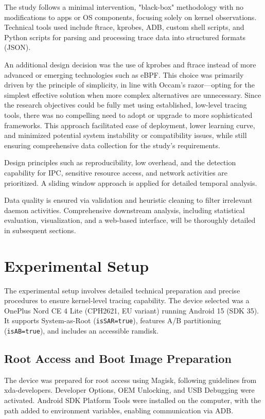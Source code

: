 \documentclass[a4paper,12pt]{report}
\begin{document}
The study follows a minimal intervention, "black-box" methodology with no modifications to apps or OS components, focusing solely on kernel observations. Technical tools used include ftrace, kprobes, ADB, custom shell scripts, and Python scripts for parsing and processing trace data into structured formats (JSON).

An additional design decision was the use of kprobes and ftrace instead of more advanced or emerging technologies such as eBPF. This choice was primarily driven by the principle of simplicity, in line with Occam's razor—opting for the simplest effective solution when more complex alternatives are unnecessary. Since the research objectives could be fully met using established, low-level tracing tools, there was no compelling need to adopt or upgrade to more sophisticated frameworks. This approach facilitated ease of deployment, lower learning curve, and minimized potential system instability or compatibility issues, while still ensuring comprehensive data collection for the study's requirements.

Design principles such as reproducibility, low overhead, and the detection capability for IPC, sensitive resource access, and network activities are prioritized. A sliding window approach is applied for detailed temporal analysis.

Data quality is ensured via validation and heuristic cleaning to filter irrelevant daemon activities. Comprehensive downstream analysis, including statistical evaluation, visualization, and a web-based interface, will be thoroughly detailed in subsequent sections.
\section{Experimental Setup}

The experimental setup involves detailed technical preparation and precise procedures to ensure kernel-level tracing capability. The device selected was a OnePlus Nord CE 4 Lite (CPH2621, EU variant) running Android 15 (SDK 35). It supports System-as-Root (\texttt{isSAR=true}), features A/B partitioning (\texttt{isAB=true}), and includes an accessible ramdisk.

\subsection{Root Access and Boot Image Preparation}

The device was prepared for root access using Magisk, following guidelines from xda-developers. Developer Options, OEM Unlocking, and USB Debugging were activated. Android SDK Platform Tools were installed on the computer, with the path added to environment variables, enabling communication via ADB.
\end{document}
